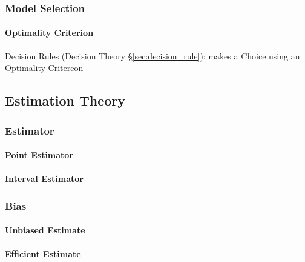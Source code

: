 \subsubsection{Model Selection}\label{sec:model_selection}

\paragraph{Optimality Criterion}\label{sec:optimality_criterion}\hfill

\fist Decision Rules (Decision Theory \S\ref{sec:decision_rule}): makes a
Choice using an Optimality Critereon



\subsection{Estimation Theory}\label{sec:estimation_theory}

\subsubsection{Estimator}\label{sec:estimator}

\paragraph{Point Estimator}\label{sec:point_estimator}\hfill

\paragraph{Interval Estimator}\label{sec:interval_estimator}\hfill



\subsubsection{Bias}\label{sec:bias}

\paragraph{Unbiased Estimate}\label{sec:unbiased_estimate}\hfill

\paragraph{Efficient Estimate}\label{sec:efficient_estimate}\hfill

